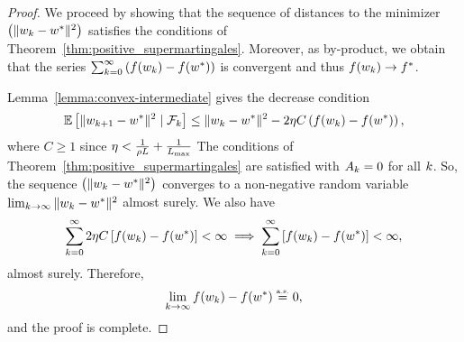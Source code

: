 \wgcAlmostSure*
\begin{proof}
    We proceed by showing that the sequence of distances to the minimizer \( \left(\|w_k - w^*\|^2\right) \) satisfies the conditions of Theorem~\ref{thm:positive_supermartingales}.
    Moreover, as by-product, we obtain that the series \( \sum_{k=0}^{\infty} \left(f(w_k) - f(w^*)\right) \) is convergent and thus \( f(w_k) \rightarrow f^* \).

    Lemma~\ref{lemma:convex-intermediate} gives the decrease condition
    \begin{align*}
        \mathbb{E} \left[\|w_{k+1} - w^*\|^2 \mid \mathcal{F}_k\right] \leq  \|w_k - w^*\|^2 - 2 \eta C \left(f(w_k) - f(w^*)\right),
    \end{align*}
    where \( C \geq 1 \) since \( \eta < \frac{1}{\rho L} + \frac{1}{L_{\text{max}}} \)
    The conditions of Theorem~\ref{thm:positive_supermartingales} are satisfied with \( A_k = 0 \) for all \( k \).
    So, the sequence \( \left(\|w_k - w^*\|^2\right) \) converges to a non-negative random variable \(\lim_{k \rightarrow \infty} \|w_k - w^*\|^2 \) almost surely.
    We also have
    \begin{align*}
        \sum_{k=0}^{\infty} 2\eta C \left[f(w_k) - f(w^*)\right] < \infty
        \implies \sum_{k=0}^{\infty} \left[f(w_k) - f(w^*)\right] < \infty,
    \end{align*}
    almost surely.
    Therefore,
    \[ \lim_{k \rightarrow \infty} f(w_k) - f(w^*) \stackrel{\text{\rm\tiny a.s.}}{=} 0, \]
    and the proof is complete.
\end{proof}

